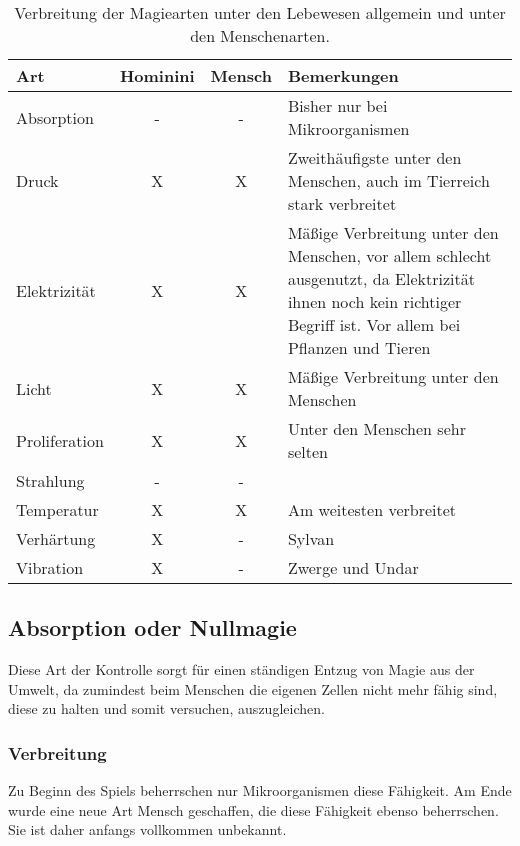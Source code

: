 \begin{table}[htbp]
	\centering
	\caption{Verbreitung der Magiearten unter den Lebewesen allgemein und unter den Menschenarten.}
	\label{tab:magie-verbreitung}
	\begin{threeparttable}[\linewidth]
		\begin{tabularx}{\textwidth}{l|ccX}
			\toprule
			\textbf{Art} & \textbf{Hominini} & \textbf{Mensch} & \textbf{Bemerkungen} \\
		    \midrule
			Absorption & - & - & Bisher nur bei Mikroorganismen \\
			Druck & X & X & Zweithäufigste unter den Menschen, auch im Tierreich stark verbreitet \\
			Elektrizität & X & X & Mäßige Verbreitung unter den Menschen, vor allem schlecht ausgenutzt, da Elektrizität ihnen noch kein richtiger Begriff ist. Vor allem bei Pflanzen und Tieren \\
			Licht & X & X & Mäßige Verbreitung unter den Menschen \\
			Proliferation & X & X & Unter den Menschen sehr selten \\
			Strahlung & - & - &  \\
			Temperatur & X & X & Am weitesten verbreitet \\
			Verhärtung & X & - & Sylvan \\
			Vibration & X & - & Zwerge und Undar \\
			\bottomrule
		\end{tabularx}
	\end{threeparttable}
\end{table}



\subsection{Absorption oder Nullmagie}\label{sec:nullmagie}
Diese Art der Kontrolle sorgt für einen ständigen Entzug von Magie aus der Umwelt, da zumindest beim Menschen die eigenen Zellen nicht mehr fähig sind, diese zu halten und somit versuchen, auszugleichen. 

\subsubsection{Verbreitung}
Zu Beginn des Spiels beherrschen nur Mikroorganismen diese Fähigkeit. Am Ende wurde eine neue Art Mensch geschaffen, die diese Fähigkeit ebenso beherrschen. Sie ist daher anfangs vollkommen unbekannt.

